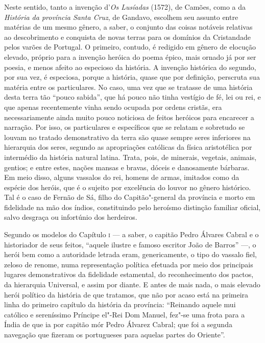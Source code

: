 Neste sentido, tanto a invenção d'\textit{Os Lusíadas} (1572),
de Camões, como a da \textit{História da província Santa Cruz}, de Gandavo,
escolhem seu assunto entre matérias de um mesmo gênero, a saber, o
conjunto das coisas notáveis relativas ao descobrimento e conquista de
novas terras para os domínios da Cristandade pelos varões de Portugal.
O primeiro, contudo, é redigido em gênero de elocução elevado, próprio
para a invenção heróica do poema épico, mais ornado já por ser poesia,
e menos afeito ao especioso da história. A invenção histórica do
segundo, por sua vez, é especiosa, porque a história, quase que por
definição, perscruta sua matéria entre os particulares. No caso, uma
vez que se tratasse de uma história desta terra tão
``pouco sabida'', que há pouco não tinha vestígio de fé, lei ou rei, 
e que apenas recentemente vinha sendo
ocupada por ordens cristãs, era necessariamente ainda muito pouco
noticiosa de feitos heróicos para encarecer a narração. Por isso, os
particulares e específicos que se relatam e sobretudo se louvam no
tratado demonstrativo da terra são quase sempre seres inferiores na
hierarquia dos seres, segundo as apropriações católicas da física
aristotélica por intermédio da história natural latina. Trata, pois, de
minerais, vegetais, animais, gentios; e entre estes, nações mansas e
bravas, dóceis e danosamente bárbaras. Em meio disso, alguns vassalos
do rei, homens de armas, imitados como da espécie dos heróis, que é o
sujeito por excelência do louvor no gênero histórico. Tal é o caso de
Fernão de Sá, filho do Capitão"-general da província e morto em
fidelidade na mão dos índios, constituindo pelo heroísmo distinção
familiar oficial, salvo desgraça ou infortúnio dos herdeiros.

Segundo os modelos do Capítulo \textsc{i} --- a saber, o capitão Pedro Álvares Cabral
e o historiador de seus feitos, ``aquele ilustre e famoso
escritor João de Barros'' ---, o herói bem como a autoridade
letrada eram, genericamente, o tipo do vassalo fiel, zeloso de renome,
numa representação política efetuada por meio dos principais lugares
demonstrativos da fidelidade estamental, do reconhecimento dos pactos,
da hierarquia Universal, e assim por diante. E antes de mais nada, o
mais elevado herói político da história de que tratamos, que não por
acaso está na primeira linha do primeiro capítulo da história da
província: ``Reinando aquele mui católico e sereníssimo
Príncipe el"-Rei Dom Manuel, fez"-se uma frota para a Índia de que ia por
capitão mór Pedro Álvarez Cabral; que foi a segunda navegação que fizeram
os portugueses para aquelas partes do Oriente''.

